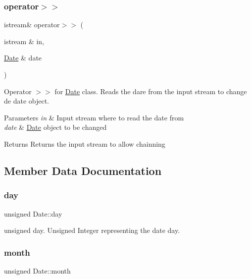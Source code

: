 \subsubsection{\texorpdfstring{operator$>$$>$}{operator>>}}
{\footnotesize\ttfamily istream\& operator$>$$>$ (\begin{DoxyParamCaption}\item[{istream \&}]{in,  }\item[{\hyperlink{class_date}{Date} \&}]{date }\end{DoxyParamCaption})\hspace{0.3cm}{\ttfamily [friend]}}

Operator $>$$>$ for \hyperlink{class_date}{Date} class. Reads the dare from the input stream to change de date object. 
\begin{DoxyParams}{Parameters}
{\em in} & Input stream where to read the date from \\
\hline
{\em date} & \hyperlink{class_date}{Date} object to be changed \\
\hline
\end{DoxyParams}
\begin{DoxyReturn}{Returns}
Returns the input stream to allow chainning 
\end{DoxyReturn}


\subsection{Member Data Documentation}
\mbox{\label{class_date_a088706519330e455b4f68957d6801cde}} 
\subsubsection{\texorpdfstring{day}{day}}
{\footnotesize\ttfamily unsigned Date\+::day\hspace{0.3cm}{\ttfamily [private]}}

unsigned day. Unsigned Integer representing the date day. \mbox{\label{class_date_aaa152f8b795cf43cbd17db72ad1263be}} 
\subsubsection{\texorpdfstring{month}{month}}
{\footnotesize\ttfamily unsigned Date\+::month\hspace{0.3cm}{\ttfamily [private]}}


